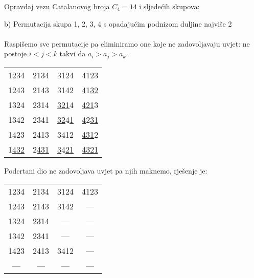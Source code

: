 \documentclass[exam.tex]{subfiles}
\begin{document}
	Opravdaj vezu Catalanovog broja \( C_4 = 14 \) i sljedećih skupova: 
	
	b) Permutacija skupa {1, 2, 3, 4} s opadajućim podnizom duljine najviše 2 \\ \\
	
	Raspišemo sve permutacije pa eliminiramo one koje ne zadovoljavaju uvjet: ne postoje \( i < j < k \) takvi da \( a_i > a_j > a_k \).
	
	\begin{center}
		\begin{tabular}{ cccc } 
	 		1234 & 2134 & 3124 & 4123 \\
			1243 & 2143 & 3142 & \underline{4}1\underline{32} \\
			1324 & 2314 & \underline{321}4 & \underline{421}3 \\
			1342 & 2341 & \underline{32}4\underline{1} & \underline{4}2\underline{31} \\ 
			1423 & 2413 & 3412 & \underline{431}2 \\ 
			1\underline{432} & 2\underline{431} & \underline{3}4\underline{21} & \underline{4321}
		\end{tabular}
	\end{center}
	
	Podcrtani dio ne zadovoljava uvjet pa njih maknemo, rješenje je:
	
	\begin{center}
		\begin{tabular}{ cccc } 
	 		1234 & 2134 & 3124 & 4123 \\
			1243 & 2143 & 3142 & ---  \\
			1324 & 2314 & ---  & ---  \\
			1342 & 2341 & ---  & ---  \\ 
			1423 & 2413 & 3412 & ---  \\ 
			---  & ---  & ---  & ---
		\end{tabular}
	\end{center}
\end{document}
